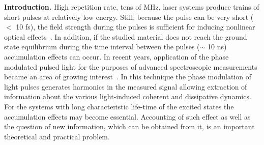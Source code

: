 \documentclass[prb,twocolumn,showpacs,epsfig,epsf]{revtex4}
\newcommand{\1}{\mathds{1}}
\begin{document}
{\bf Introduction.}
High repetition rate, tens of MHz, laser systems produce trains of short pulses at relatively low energy. Still, because the pulse can be very short ($<$ 10 fs), the field strength during the pulses is sufficient for inducing nonlinear optical effects~\cite{BoydBook}. In addition, if the studied material does not reach the ground state equilibrium during the time interval between the pulses ($\sim$ 10 ns) accumulation effects can occur. In recent years, application of the phase modulated pulsed light for the purposes of advanced spectroscopic measurements became an area of growing interest~\cite{our, KWSMLPM2014, LBSE2017, KKMP2016, BBS2015, TDM2003, TLM2007, BBS2017, M2016}. In this technique the phase modulation of light pulses generates harmonics in the measured signal allowing extraction of information about the various light-induced coherent and dissipative dynamics. For the systems with long characteristic life-time of the excited states the accumulation effects may become essential. Accounting of such effect as well as the question of new information, which can be obtained from it, is an important theoretical and practical problem. 
\end{document}
